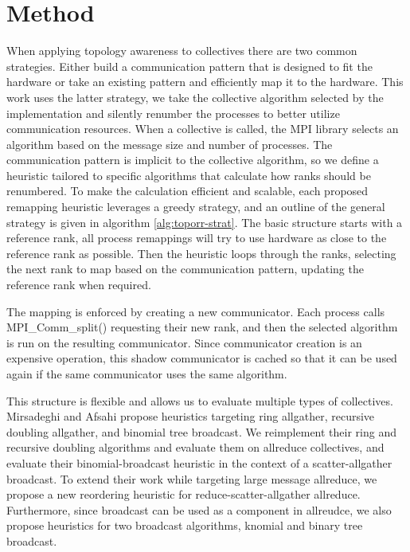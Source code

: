 \section{Method}
When applying topology awareness to collectives there are two common strategies.
Either build a communication pattern that is designed to fit the hardware or take an existing pattern and efficiently map it to the hardware.
This work uses the latter strategy, we take the collective algorithm selected by the implementation and silently renumber the processes to better utilize communication resources.
When a collective is called, the MPI library selects an algorithm based on the message size and number of processes.
The communication pattern is implicit to the collective algorithm, so we define a heuristic tailored to specific algorithms that calculate how ranks should be renumbered.
To make the calculation efficient and scalable, each proposed remapping heuristic leverages a greedy strategy, and an outline of the general strategy is given in algorithm \ref{alg:toporr-strat}.
The basic structure starts with a reference rank, all process remappings will try to use hardware as close to the reference rank as possible.
Then the heuristic loops through the ranks, selecting the next rank to map based on the communication pattern, updating the reference rank when required.

The mapping is enforced by creating a new communicator.
Each process calls MPI\_Comm\_split() requesting their new rank, and then the selected algorithm is run on the resulting communicator.
Since communicator creation is an expensive operation, this shadow communicator is cached so that it can be used again if the same communicator uses the same algorithm.

This structure is flexible and allows us to evaluate multiple types of collectives.
Mirsadeghi and Afsahi \cite{Mirsadeghi2016TopoAwareCollRR} propose heuristics targeting ring allgather, recursive doubling allgather, and binomial tree broadcast. 
We reimplement their ring and recursive doubling algorithms and evaluate them on allreduce collectives, and evaluate their binomial-broadcast heuristic in the context of a scatter-allgather broadcast.
To extend their work while targeting large message allreduce, we propose a new reordering heuristic for reduce-scatter-allgather allreduce.
Furthermore, since broadcast can be used as a component in allreudce, we also propose heuristics for two broadcast algorithms, knomial and binary tree broadcast.

% 


